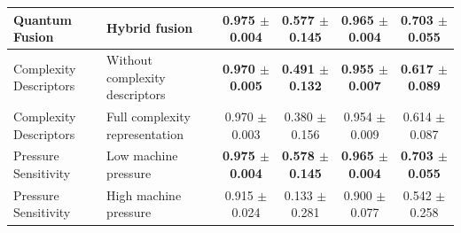 \begin{table}[h]
{\begin{tabular}{l l c c c c}
Quantum Fusion & Hybrid fusion & \textbf{0.975 $\pm$ 0.004} & \textbf{0.577 $\pm$ 0.145} & \textbf{0.965 $\pm$ 0.004} & \textbf{0.703 $\pm$ 0.055} \\
\hline
Complexity Descriptors & Without complexity descriptors & \textbf{0.970 $\pm$ 0.005} & \textbf{0.491 $\pm$ 0.132} & \textbf{0.955 $\pm$ 0.007} & \textbf{0.617 $\pm$ 0.089} \\
Complexity Descriptors & Full complexity representation & 0.970 $\pm$ 0.003 & 0.380 $\pm$ 0.156 & 0.954 $\pm$ 0.009 & 0.614 $\pm$ 0.087 \\
\hline
Pressure Sensitivity & Low machine pressure & \textbf{0.975 $\pm$ 0.004} & \textbf{0.578 $\pm$ 0.145} & \textbf{0.965 $\pm$ 0.004} & \textbf{0.703 $\pm$ 0.055} \\
Pressure Sensitivity & High machine pressure & 0.915 $\pm$ 0.024 & 0.133 $\pm$ 0.281 & 0.900 $\pm$ 0.077 & 0.542 $\pm$ 0.258 \\
\hline
\end{tabular}
}
\vspace{-0.5cm}
\end{table}
